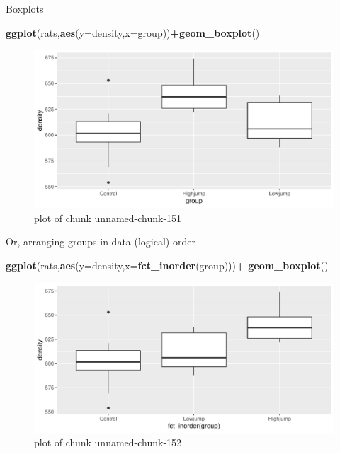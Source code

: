 \documentclass[ignorenonframetext,]{beamer}
\newenvironment{Shaded}{\begin{snugshade}}{\end{snugshade}}
\newcommand{\DataTypeTok}[1]{\textcolor[rgb]{0.13,0.29,0.53}{#1}}
\newcommand{\KeywordTok}[1]{\textcolor[rgb]{0.13,0.29,0.53}{\textbf{#1}}}
\newcommand{\NormalTok}[1]{#1}
\newcommand{\OperatorTok}[1]{\textcolor[rgb]{0.81,0.36,0.00}{\textbf{#1}}}
\begin{document}
\begin{frame}[fragile]{Boxplots}
\protect\hypertarget{boxplots-1}{}

\begin{Shaded}
\begin{Highlighting}[]
\KeywordTok{ggplot}\NormalTok{(rats,}\KeywordTok{aes}\NormalTok{(}\DataTypeTok{y=}\NormalTok{density,}\DataTypeTok{x=}\NormalTok{group))}\OperatorTok{+}\KeywordTok{geom_boxplot}\NormalTok{()}
\end{Highlighting}
\end{Shaded}

\begin{figure}
\centering
\includegraphics{figure/unnamed-chunk-151-1.pdf}
\caption{plot of chunk unnamed-chunk-151}
\end{figure}

\end{frame}

\begin{frame}[fragile]{Or, arranging groups in data (logical) order}
\protect\hypertarget{or-arranging-groups-in-data-logical-order}{}

\begin{Shaded}
\begin{Highlighting}[]
\KeywordTok{ggplot}\NormalTok{(rats,}\KeywordTok{aes}\NormalTok{(}\DataTypeTok{y=}\NormalTok{density,}\DataTypeTok{x=}\KeywordTok{fct_inorder}\NormalTok{(group)))}\OperatorTok{+}
\KeywordTok{geom_boxplot}\NormalTok{()}
\end{Highlighting}
\end{Shaded}

\begin{figure}
\centering
\includegraphics{figure/unnamed-chunk-152-1.pdf}
\caption{plot of chunk unnamed-chunk-152}
\end{figure}

\end{frame}
\end{document}
